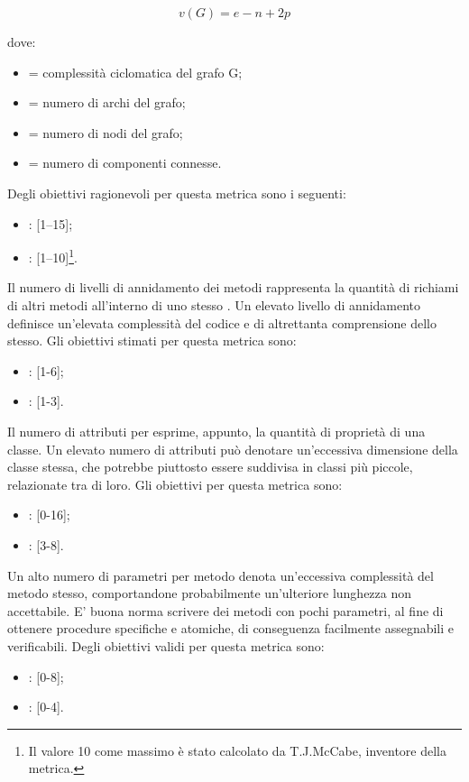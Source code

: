 $$v(G) = e - n + 2p$$

dove:
\begin{itemize}
\item {} = complessità ciclomatica del grafo G;
\item {} = numero di archi del grafo;
\item {} = numero di nodi del grafo;
\item {} = numero di componenti connesse.
\end{itemize}
Degli obiettivi ragionevoli per questa metrica sono i seguenti:
\begin{itemize}
\item {}: [1--15];
\item {}: [1--10]\footnote{Il valore 10 come massimo è stato calcolato da T.J.McCabe, inventore della metrica.}.
\end{itemize}

\label{4.2.2}
Il numero di livelli di annidamento dei metodi rappresenta la quantità di richiami di altri metodi all'interno di uno stesso .
Un elevato livello di annidamento definisce un'elevata complessità del codice e di altrettanta comprensione dello stesso.
Gli obiettivi stimati per questa metrica sono:
\begin{itemize}
\item {}: [1-6];
\item {}: [1-3].
\end{itemize}

\label{4.2.3}
Il numero di attributi per  esprime, appunto, la quantità di proprietà di una classe. Un elevato numero di attributi può denotare un'eccessiva dimensione della classe stessa, che potrebbe piuttosto essere suddivisa in classi più piccole, relazionate tra di loro.
Gli obiettivi per questa metrica sono:
\begin{itemize}
\item {}: [0-16];
\item {}: [3-8].
\end{itemize}

\label{4.2.4}
Un alto numero di parametri per metodo denota un'eccessiva complessità del metodo stesso, comportandone probabilmente un'ulteriore lunghezza non accettabile. E' buona norma scrivere dei metodi con pochi parametri, al fine di ottenere procedure specifiche e atomiche, di conseguenza facilmente assegnabili e verificabili.
Degli obiettivi validi per questa metrica sono:
\begin{itemize}
\item {}: [0-8];
\item {}: [0-4].
\end{itemize}

